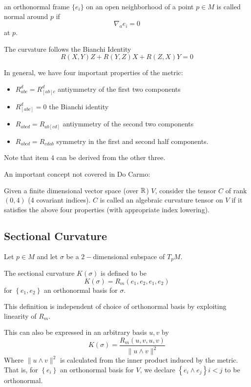\documentclass[../main.tex]{subfiles}
\begin{document}
\begin{defn}
    an orthonormal frame $\{e_i\}$ on an open neighborhood of a point $p\in M$
    is called normal around $p$ if
    \[
        \nabla_ae_i = 0
    \]
    at $p$.
\end{defn}

The curvature follows the Bianchi Identity
\[
    R(X,Y)Z + R(Y,Z)X + R(Z,X)Y = 0
\]

In general, we have four important properties of the metric:
\begin{itemize}
    \item $R_{abc}^d = R_{[ab]c}^d$ antiymmetry of the first two components
    \item $R_{[abc]}^d = 0$ the Bianchi identity
    \item $R_{abcd} = R_{ab[cd]}$ antiymmetry of the second two components
    \item $R_{abcd} = R_{cdab}$ symmetry in the first and second half
        components.
\end{itemize}
Note that item $4$ can be derived from the other three.

An important concept not covered in Do Carmo:
\begin{defn}
    Given a finite dimensional vector space (over $\mathbb{R}$) $V$, consider the tensor $C$
    of rank $(0,4)$ (4 covariant indices). $C$ is called an algebraic curvature
    tensor on $V$ if it satisfies the above four properties (with appropriate
    index lowering).
\end{defn}

\subsection*{Sectional Curvature}

Let $p\in M$ and let $\sigma$ be a $2-$dimensional subspace of $T_pM$.
\begin{defn}
    The sectional curvature $K(\sigma)$ is defined to be
    \[
        K(\sigma) = R_m(e_1,e_2,e_1,e_2)
    \]
    for $\left\{ e_1,e_2 \right\}$ an orthonormal basis for $\sigma$.
\end{defn}

This definition is independent of choice of orthonormal basis by exploiting
linearity of $R_m$.

This can also be expressed in an arbitrary basis $u,v$ by
\begin{equation}
    K(\sigma) = \frac{R_m\left( u,v,u,v \right)}{\|u\wedge v\|^2}
\end{equation}
Where $\|u\wedge v\|^2$ is calculated from the inner product induced by the
metric. That is, for $\left\{ e_i \right\}$ an orthonormal basis for $V$, we
declare $\left\{ e_i\wedge e_j \right\}i<j$ to be orthonormal.
\end{document}
